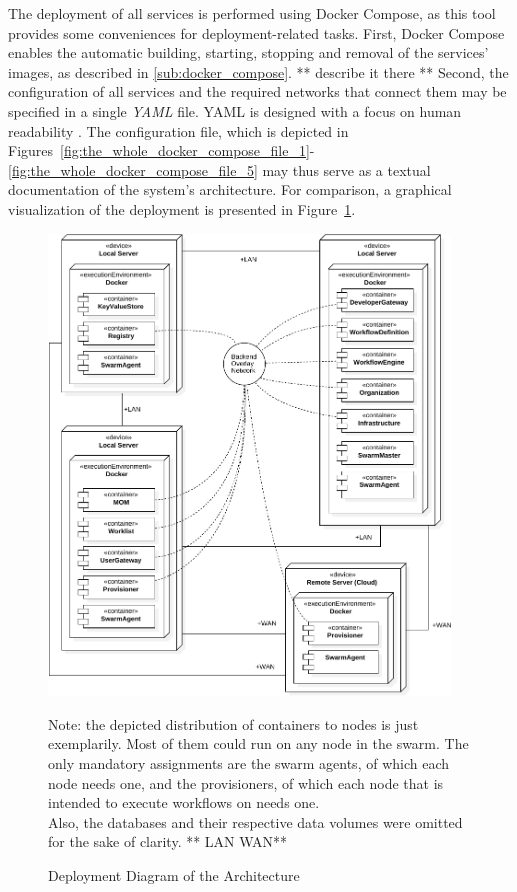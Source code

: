   The deployment of all services is performed using Docker Compose, as this tool provides some conveniences for deployment-related tasks.
  First, Docker Compose enables the automatic building, starting, stopping and removal of the services' images, as described in \ref{sub:docker_compose}. ** describe it there **
  Second, the configuration of all services and the required networks that connect them may be specified in a single \emph{YAML} file. \ac{YAML} is designed with a focus on human readability \cite{Kiki2009Yaml}. The configuration file, which is depicted in Figures~\ref{fig:the_whole_docker_compose_file_1}-\ref{fig:the_whole_docker_compose_file_5} may thus serve as a textual documentation of the system's architecture.
  For comparison, a graphical visualization of the deployment is presented in Figure~\ref{fig:deployment_diagram_of_the_architecture}.

  \begin{figure}[htbp]
    \centering
    \includegraphics[width=0.95\textwidth]{content/images/Architecture-crop.pdf}
    \caption*{\scriptsize Note: the depicted distribution of containers to nodes is just exemplarily. Most of them could run on any node in the swarm. The only mandatory assignments are the swarm agents, of which each node needs one, and the provisioners, of which each node that is intended to execute workflows on needs one. \\ Also, the databases and their respective data volumes were omitted for the sake of clarity. ** LAN WAN**}
    \caption{Deployment Diagram of the Architecture}
    \label{fig:deployment_diagram_of_the_architecture}
  \end{figure}

